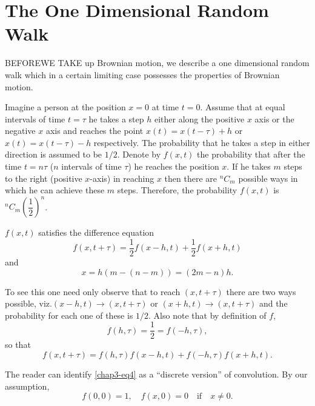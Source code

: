 \chapter{The One Dimensional Random Walk}\label{chap3}

BEFORE\pageoriginale WE TAKE up Brownian motion, we describe a one
dimensional random walk which in a certain limiting case possesses the
properties of Brownian motion.

Imagine a person at the position $x=0$ at time $t=0$. Assume that at
equal intervals of time $t=\tau$ he takes a step $h$ either along the
positive $x$ axis or the negative $x$ axis and reaches the point
$x(t)=x(t-\tau)+h$ or $x(t)=x(t-\tau)-h$ respectively. The probability
that he takes a step in either direction is assumed to be
$1/2$. Denote by $f(x,t)$ the probability that after the time
$t=n\tau$ ($n$ intervals of time $\tau$) he reaches the position
$x$. If he takes $m$ steps to the right (positive $x$-axis) in
reaching $x$ then there are ${}^{n}C_{m}$ possible ways in which he
can achieve these $m$ steps. Therefore, the probability $f(x,t)$ is
${}^{n}C_{m}(\dfrac{1}{2})^{n}$.

$f(x,t)$ satisfies the difference equation
\begin{equation*}
f(x,t+\tau)=\frac{1}{2}f(x-h,t)+\frac{1}{2}f(x+h,t)\tag{1}\label{chap3-eq1}
\end{equation*}
and
\begin{equation*}
x=h(m-(n-m))=(2m-n)h.\tag{2}\label{chap3-eq2}
\end{equation*}

To see this one need only observe that to reach $(x,t+\tau)$ there are two
ways possible, viz.\@ $(x-h,t)\to (x,t+\tau)$ or $(x+h,t)\to
(x,t+\tau)$ and the probability for each one of these is $1/2$. Also
note that by definition of $f$,
\begin{equation*}
f(h,\tau)=\frac{1}{2}=f(-h,\tau),\tag{3}\label{chap3-eq3}
\end{equation*}\pageoriginale
so that
\begin{equation*}
f(x,t+\tau)=f(h,\tau)f(x-h,t)+f(-h,\tau)f(x+h,t).\tag{4}\label{chap3-eq4}
\end{equation*}

The reader can identify \eqref{chap3-eq4} as a ``discrete version'' of
convolution. By our assumption,
\begin{equation*}
f(0,0)=1,\quad f(x,0)=0\quad\text{if}\quad x\neq 0.\tag{5}\label{chap3-eq5}
\end{equation*}

